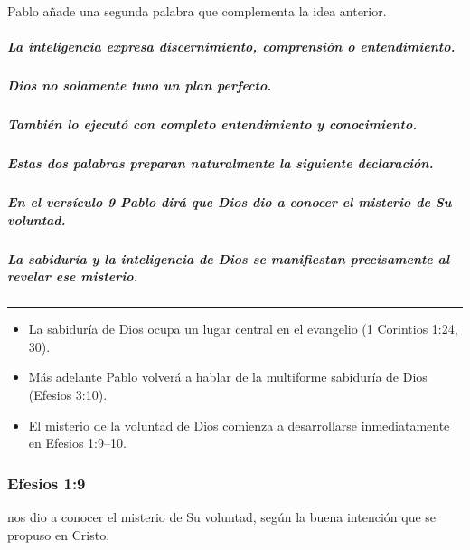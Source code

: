 \documentclass[11pt]{article}
\begin{document}
\begin{anchorblock}{Pablo añade una segunda palabra que complementa la idea anterior.}

\subparagraph{La inteligencia expresa discernimiento, comprensión o
entendimiento.}\label{la-inteligencia-expresa-discernimiento-comprensiuxf3n-o-entendimiento.}

\subparagraph{Dios no solamente tuvo un plan
perfecto.}\label{dios-no-solamente-tuvo-un-plan-perfecto.}

\subparagraph{También lo ejecutó con completo entendimiento y
conocimiento.}\label{tambiuxe9n-lo-ejecutuxf3-con-completo-entendimiento-y-conocimiento.}

\subparagraph{Estas dos palabras preparan naturalmente la siguiente
declaración.}\label{estas-dos-palabras-preparan-naturalmente-la-siguiente-declaraciuxf3n.}

\subparagraph{En el versículo 9 Pablo dirá que Dios dio a conocer el
misterio de Su
voluntad.}\label{en-el-versuxedculo-9-pablo-diruxe1-que-dios-dio-a-conocer-el-misterio-de-su-voluntad.}

\subparagraph{La sabiduría y la inteligencia de Dios se manifiestan
precisamente al revelar ese
misterio.}\label{la-sabiduruxeda-y-la-inteligencia-de-dios-se-manifiestan-precisamente-al-revelar-ese-misterio.}

\begin{center}\rule{0.5\linewidth}{0.5pt}\end{center}


\begin{itemize}
\tightlist
\item
  La sabiduría de Dios ocupa un lugar central en el evangelio (1
  Corintios 1:24, 30).
\item
  Más adelante Pablo volverá a hablar de la multiforme sabiduría de Dios
  (Efesios 3:10).
\item
  El misterio de la voluntad de Dios comienza a desarrollarse
  inmediatamente en Efesios 1:9--10.
\end{itemize}

\end{anchorblock}

\subsubsection{Efesios 1:9}\label{efesios-19}

\begin{verseblock}
nos dio a conocer el misterio de Su voluntad, según la buena intención que se propuso en Cristo,
\end{verseblock}
\end{document}

